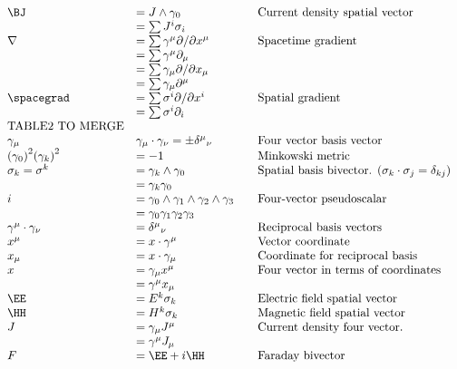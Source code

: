 \begin{equation*}
\begin{array}{l l l}
\BJ &= J \wedge \gamma_0 & \quad \mbox{Current density spatial vector} \\
    &= \sum J^i \sigma_i \\
\grad &= \sum \gamma^{\mu} \partial/\partial {x^{\mu}} & \quad \mbox{Spacetime gradient} \\
      &= \sum \gamma^{\mu}\partial_{\mu} \\
      &= \sum \gamma_{\mu} \partial/\partial {x_{\mu}} \\
      &= \sum \gamma_{\mu}\partial^{\mu} \\
\spacegrad &= \sum \sigma^{i} \partial/\partial{x^{i}} & \quad \mbox{Spatial gradient} \\
           &= \sum \sigma^{i}\partial_{i} \\
\mbox{TABLE2 TO MERGE} \\
\gamma_{\mu} & \gamma_{\mu} \cdot \gamma_{\nu} = \pm {\delta^{\mu}}_{\nu} & \quad \mbox{Four vector basis vector} \\
{(\gamma_0)}^2 {(\gamma_k)}^2 &= -1 & \quad \mbox{Minkowski metric} \\
\sigma_k = \sigma^k &= \gamma_{k} \wedge \gamma_0 & \quad \mbox{Spatial basis bivector. ($\sigma_k \cdot \sigma_j = \delta_{kj}$)} \\
                    &= \gamma_{k} \gamma_0 & \\
i &= \gamma_{0} \wedge \gamma_1 \wedge \gamma_{2} \wedge \gamma_3 & \quad \mbox{Four-vector pseudoscalar} \\
  &= \gamma_{0} \gamma_1 \gamma_{2} \gamma_3 & \\
\gamma^{\mu} \cdot \gamma_{\nu} &= {\delta^{\mu}}_{\nu} & \quad \mbox{Reciprocal basis vectors} \\
x^{\mu} &= x \cdot \gamma^{\mu} & \quad \mbox{Vector coordinate} \\
x_{\mu} &= x \cdot \gamma_{\mu} & \quad \mbox{Coordinate for reciprocal basis} \\
x &= \gamma_{\mu} x^{\mu} & \quad \mbox{Four vector in terms of coordinates} \\
  &= \gamma^{\mu} x_{\mu} \\
\EE &= E^k \sigma_k & \quad \mbox{Electric field spatial vector} \\
\HH &= H^k \sigma_k & \quad \mbox{Magnetic field spatial vector} \\
J &= \gamma_{\mu} J^{\mu} & \quad \mbox{Current density four vector.} \\
  &= \gamma^{\mu} J_{\mu} \\
F &= \EE + i \HH & \quad \mbox{Faraday bivector} \\

\end{array}
\end{equation*}
